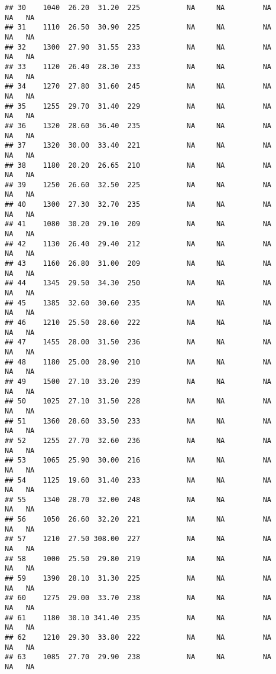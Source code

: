 \documentclass[
]{article}
\begin{document}
\begin{verbatim}
## 30    1040  26.20  31.20  225           NA     NA         NA      NA   NA
## 31    1110  26.50  30.90  225           NA     NA         NA      NA   NA
## 32    1300  27.90  31.55  233           NA     NA         NA      NA   NA
## 33    1120  26.40  28.30  233           NA     NA         NA      NA   NA
## 34    1270  27.80  31.60  245           NA     NA         NA      NA   NA
## 35    1255  29.70  31.40  229           NA     NA         NA      NA   NA
## 36    1320  28.60  36.40  235           NA     NA         NA      NA   NA
## 37    1320  30.00  33.40  221           NA     NA         NA      NA   NA
## 38    1180  20.20  26.65  210           NA     NA         NA      NA   NA
## 39    1250  26.60  32.50  225           NA     NA         NA      NA   NA
## 40    1300  27.30  32.70  235           NA     NA         NA      NA   NA
## 41    1080  30.20  29.10  209           NA     NA         NA      NA   NA
## 42    1130  26.40  29.40  212           NA     NA         NA      NA   NA
## 43    1160  26.80  31.00  209           NA     NA         NA      NA   NA
## 44    1345  29.50  34.30  250           NA     NA         NA      NA   NA
## 45    1385  32.60  30.60  235           NA     NA         NA      NA   NA
## 46    1210  25.50  28.60  222           NA     NA         NA      NA   NA
## 47    1455  28.00  31.50  236           NA     NA         NA      NA   NA
## 48    1180  25.00  28.90  210           NA     NA         NA      NA   NA
## 49    1500  27.10  33.20  239           NA     NA         NA      NA   NA
## 50    1025  27.10  31.50  228           NA     NA         NA      NA   NA
## 51    1360  28.60  33.50  233           NA     NA         NA      NA   NA
## 52    1255  27.70  32.60  236           NA     NA         NA      NA   NA
## 53    1065  25.90  30.00  216           NA     NA         NA      NA   NA
## 54    1125  19.60  31.40  233           NA     NA         NA      NA   NA
## 55    1340  28.70  32.00  248           NA     NA         NA      NA   NA
## 56    1050  26.60  32.20  221           NA     NA         NA      NA   NA
## 57    1210  27.50 308.00  227           NA     NA         NA      NA   NA
## 58    1000  25.50  29.80  219           NA     NA         NA      NA   NA
## 59    1390  28.10  31.30  225           NA     NA         NA      NA   NA
## 60    1275  29.00  33.70  238           NA     NA         NA      NA   NA
## 61    1180  30.10 341.40  235           NA     NA         NA      NA   NA
## 62    1210  29.30  33.80  222           NA     NA         NA      NA   NA
## 63    1085  27.70  29.90  238           NA     NA         NA      NA   NA

\end{verbatim}
\end{document}
